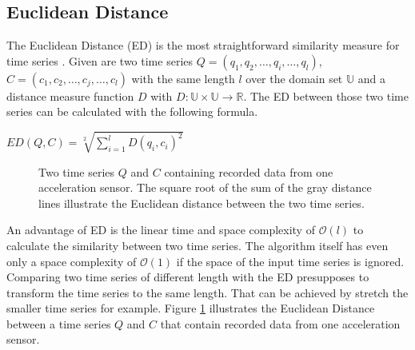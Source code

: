 \subsection{Euclidean Distance} \label{euclidean_distance}
The Euclidean Distance (ED) is the most straightforward similarity measure for time series \cite{ding2008querying}.
Given are two time series $Q = (q_1, q_2, \dots, q_i, \dots, q_l)$, $C = (c_1, c_2, \dots, c_j, \dots, c_l)$ with the
same length $l$ over the domain set $\mathbb{U}$ and a distance measure function $D$ with
$D: \mathbb{U} \times \mathbb{U} \to \mathbb{R}$. The ED between those two time series can be calculated with the
following formula.
\begin{center}
    $ED(Q, C) = \sqrt[2]{\sum \limits_{i=1}^{l} D(q_i, c_i)^2}$
\end{center}

\begin{figure}[H]
    \begin{center}
    \end{center}
    \caption{Two time series $Q$ and $C$ containing recorded data from one acceleration sensor. The square root of the
    sum of the gray distance lines illustrate the Euclidean distance between the two time series.}
    \label{fig:euclideandistance}
\end{figure}

An advantage of ED is the linear time and space complexity of $\mathcal{O}(l)$ to calculate the similarity between two
time series. The algorithm itself has even only a space complexity of $\mathcal{O}(1)$ if the space of the input time
series is ignored. Comparing two time series of different length with the ED presupposes to transform the time series
to the same length. That can be achieved by stretch the smaller time series for example. Figure
\ref{fig:euclideandistance} illustrates the Euclidean Distance between a time series $Q$ and $C$ that contain recorded
data from one acceleration sensor.

